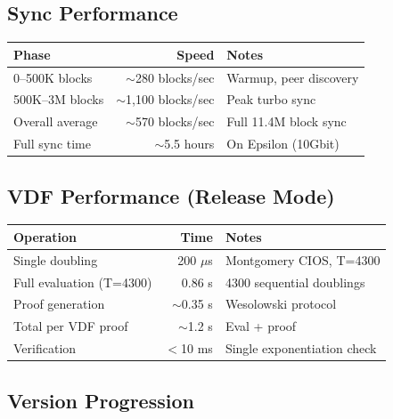 \documentclass[12pt,a4paper]{article}
\begin{document}
\subsection{Sync Performance}

\begin{center}
\begin{tabular}{@{}lrl@{}}
\toprule
\textbf{Phase} & \textbf{Speed} & \textbf{Notes} \\
\midrule
0--500K blocks & $\sim$280 blocks/sec & Warmup, peer discovery \\
500K--3M blocks & $\sim$1{,}100 blocks/sec & Peak turbo sync \\
Overall average & $\sim$570 blocks/sec & Full 11.4M block sync \\
Full sync time & $\sim$5.5 hours & On Epsilon (10Gbit) \\
\bottomrule
\end{tabular}
\end{center}

\subsection{VDF Performance (Release Mode)}

\begin{center}
\begin{tabular}{@{}lrl@{}}
\toprule
\textbf{Operation} & \textbf{Time} & \textbf{Notes} \\
\midrule
Single doubling & 200 $\mu$s & Montgomery CIOS, T=4300 \\
Full evaluation (T=4300) & 0.86 s & 4300 sequential doublings \\
Proof generation & $\sim$0.35 s & Wesolowski protocol \\
Total per VDF proof & $\sim$1.2 s & Eval + proof \\
Verification & $<$10 ms & Single exponentiation check \\
\bottomrule
\end{tabular}
\end{center}

\subsection{Version Progression}
\end{document}
